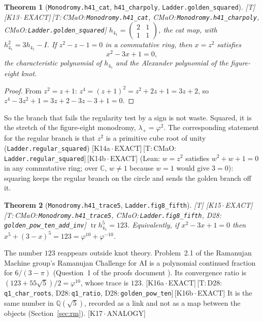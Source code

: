 \documentclass[11pt]{article}
\newtheorem{theorem}{Theorem}
\theoremstyle{definition}
\newcommand{\grade}[1]{\textsf{\small[#1]}}
\newcommand{\lean}[1]{\texttt{\small #1}}
\newcommand{\dtag}[1]{#1}
\begin{document}
\begin{theorem}[\lean{Monodromy.h41\_cat}, \lean{h41\_charpoly}, \lean{Ladder.golden\_squared}]\grade{T}\dtag{ \textsf{\small[K13\,$\cdot$\,EXACT]}\,\textsf{\small[T:\,CMaO:\,\lean{Monodromy.\allowbreak{}h41\_\allowbreak{}cat}, CMaO:\,\lean{Monodromy.\allowbreak{}h41\_\allowbreak{}charpoly}, CMaO:\,\lean{Ladder.\allowbreak{}golden\_\allowbreak{}squared}]}}
$h_{4_1}=\begin{pmatrix}2&1\\1&1\end{pmatrix}$, the cat map, with $h_{4_1}^2=3h_{4_1}-I$. If $z^2-z-1=0$ in a commutative ring, then $x=z^2$ satisfies
\[ x^2-3x+1=0 , \]
the characteristic polynomial of $h_{4_1}$ and the Alexander polynomial of the figure-eight knot.
\end{theorem}
\begin{proof}
From $z^2=z+1$: $z^4=(z+1)^2=z^2+2z+1=3z+2$, so $z^4-3z^2+1=3z+2-3z-3+1=0$.
\end{proof}

So the branch that fails the regularity test by a sign is not waste. Squared, it is the stretch of the figure-eight monodromy, $\lambda_+=\varphi^2$. The corresponding statement for the regular branch is that $z^2$ is a primitive cube root of unity (\lean{Ladder.regular\_squared})\dtag{ \textsf{\small[K14a\,$\cdot$\,EXACT]}\,\textsf{\small[T:\,CMaO:\,\lean{Ladder.\allowbreak{}regular\_\allowbreak{}squared}]}\,\textsf{\small[K14b\,$\cdot$\,EXACT]}} (Lean: $w=z^2$ satisfies $w^2+w+1=0$ in any commutative ring; over $\mathbb C$, $w\neq1$ because $w=1$ would give $3=0$): squaring keeps the regular branch on the circle and sends the golden branch off it.

\begin{theorem}[\lean{Monodromy.h41\_trace5}, \lean{Ladder.fig8\_fifth}]\grade{T}\dtag{ \textsf{\small[K15\,$\cdot$\,EXACT]}\,\textsf{\small[T:\,CMaO:\,\lean{Monodromy.\allowbreak{}h41\_\allowbreak{}trace5}, CMaO:\,\lean{Ladder.\allowbreak{}fig8\_\allowbreak{}fifth}, D28:\,\lean{golden\_\allowbreak{}pow\_\allowbreak{}ten\_\allowbreak{}add\_\allowbreak{}inv}]}}
$\operatorname{tr}h_{4_1}^5=123$. Equivalently, if $x^2-3x+1=0$ then $x^5+(3-x)^5=123=\varphi^{10}+\varphi^{-10}$.
\end{theorem}

The number $123$ reappears outside knot theory. Problem~2.1 of the Ramanujan Machine group's Ramanujan Challenge for AI \cite{RMchallenge} is a polynomial continued fraction for $6/(3-\pi)$ (Question~1 of the proofs document \cite{RMproofs}). Its convergence ratio is $(123+55\sqrt5)/2=\varphi^{10}$, whose trace is $123$.\dtag{ \textsf{\small[K16a\,$\cdot$\,EXACT]}\,\textsf{\small[T:\,D28:\,\lean{q1\_\allowbreak{}char\_\allowbreak{}roots}, D28:\,\lean{q1\_\allowbreak{}ratio}, D28:\,\lean{golden\_\allowbreak{}pow\_\allowbreak{}ten}]}\,\textsf{\small[K16b\,$\cdot$\,EXACT]}} It is the same number in $\mathbb Q(\sqrt5)$, recorded as a link and not as a map between the objects (Section~\ref{sec:rm}).\dtag{ \textsf{\small[K17\,$\cdot$\,ANALOGY]}}
\end{document}
